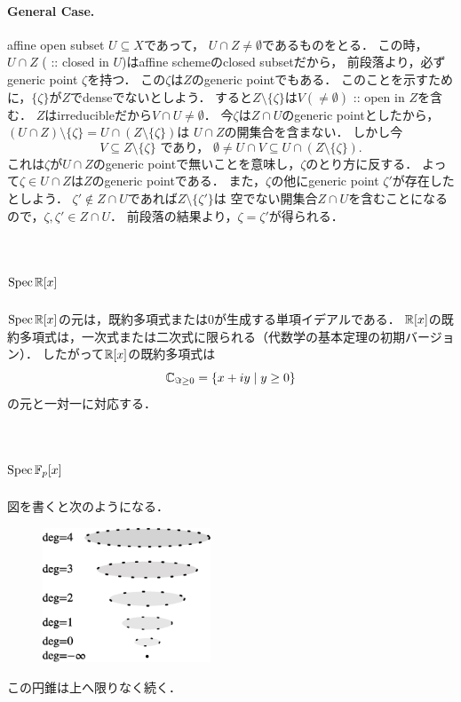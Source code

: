 \documentclass[a4paper]{jsarticle}
\begin{document}
    \paragraph{General Case.}
    affine open subset $U \subseteq X$であって，
    $U \cap Z \neq \emptyset$であるものをとる．
    この時，$U \cap Z$ ( :: closed in $U$)はaffine schemeのclosed subsetだから，
    前段落より，必ずgeneric point $\zeta$を持つ．
    この$\zeta$は$Z$のgeneric pointでもある．
    このことを示すために，$\{\zeta\}$が$Z$でdenseでないとしよう．
    すると$Z \setminus \{\zeta\}$は$V (\neq \emptyset)$ :: open in $Z$を含む．
    $Z$はirreducibleだから$V \cap U \neq \emptyset$．
    今$\zeta$は$Z \cap U$のgeneric pointとしたから，
    $(U \cap Z) \setminus \{\zeta\}=U \cap (Z \setminus \{\zeta\})$は
    $U \cap Z$の開集合を含まない．
    しかし今
    \[
        V \subseteq Z \setminus \{\zeta\}
        \text{ であり， }
        \emptyset \neq U \cap V \subseteq U \cap (Z \setminus \{\zeta\}).
    \]
    これは$\zeta$が$U \cap Z$のgeneric pointで無いことを意味し，$\zeta$のとり方に反する．
    よって$\zeta \in U \cap Z$は$Z$のgeneric pointである．
    また，$\zeta$の他にgeneric point $\zeta'$が存在したとしよう．
    $\zeta' \not \in Z \cap U$であれば$Z \setminus \{\zeta'\}$は
    空でない開集合$Z \cap U$を含むことになるので，$\zeta, \zeta' \in Z \cap U$．
    前段落の結果より，$\zeta=\zeta'$が得られる．

\section{$\operatorname{Spec} \mathbb{R}[x]$} %
    $\operatorname{Spec} \mathbb{R}[x]$の元は，既約多項式または0が生成する単項イデアルである．
    $\mathbb{R}[x]$の既約多項式は，一次式または二次式に限られる（代数学の基本定理の初期バージョン）．
    したがって$\mathbb{R}[x]$の既約多項式は
    \[ \mathbb{C}_{\Im \geq 0}=\{ x+iy \mid y \geq 0 \} \]
    の元と一対一に対応する．

\section{$\operatorname{Spec} \mathbb{F}_p[x]$} %
    図を書くと次のようになる．
    \begin{figure}[h]
    \begin{center}
        \includegraphics[width=5cm]{./images/SpecF_p[x].eps}
    \end{center}
    \end{figure}
    この円錐は上へ限りなく続く．
\end{document}
